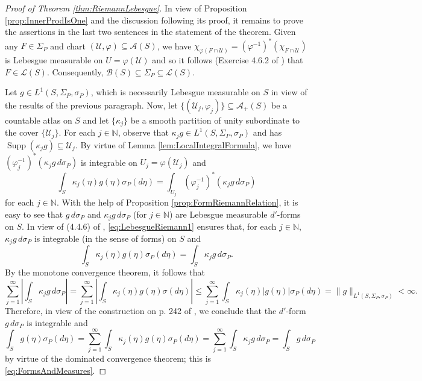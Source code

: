 \documentclass[11pt]{article}
\theoremstyle{remark}
\newcommand\supp{\operatorname{Supp}}
\begin{document}
\begin{proof}[Proof of Theorem \ref{thm:RiemannLebesgue}]
In view of Proposition \ref{prop:InnerProdIsOne} and the discussion following its proof, it remains to prove the assertions in the last two sentences in the statement of the theorem. Given any $F\in \Sigma_P$ and chart $(\mathcal{U},\varphi)\subseteq \mathcal{A}(S)$, we have $\chi_{\varphi(F\cap \mathcal{U})}=(\varphi^{-1})^*\left(\chi_{F\cap\mathcal{U}}\right)$ is Lebesgue measurable on $U=\varphi(\mathcal{U})$ and so it follows (Exercise 4.6.2 of \cite{naber_topology_2011}) that $F\in\mathcal{L}(S)$. Consequently, $\mathcal{B}(S)\subseteq\Sigma_P\subseteq\mathcal{L}(S)$.

Let $g\in L^1(S,\Sigma_P,\sigma_P)$, which is necessarily Lebesgue measurable on $S$ in view of the results of the previous paragraph. Now, let  $\{(\mathcal{U}_j,\varphi_j)\}\subseteq\mathcal{A}_+(S)$ be a countable atlas on $S$ and let $\{\kappa_j\}$ be a smooth partition of unity subordinate to the cover $\{\mathcal{U}_j\}$. For each $j\in\mathbb{N}$, observe that $\kappa_j g\in L^1(S,\Sigma_P,\sigma_P)$ and has $\supp(\kappa_j g)\subseteq \mathcal{U}_j$. By virtue of Lemma \ref{lem:LocalIntegralFormula}, we have $(\varphi_j^{-1})^*(\kappa_j g\,d\sigma_P)$ is integrable on $U_j=\varphi(\mathcal{U}_j)$ and
\begin{equation}\label{eq:LebesgueRiemann1}
\int_S \kappa_j(\eta)g(\eta)\sigma_P(d\eta)=\int_{U_j}(\varphi_j^{-1})^*(\kappa_j g\,d\sigma_P)
\end{equation}
for each $j\in\mathbb{N}$. With the help of Proposition \ref{prop:FormRiemannRelation}, it is easy to see that $g\,d\sigma_P$ and $\kappa_j g\,d\sigma_P$ (for $j\in\mathbb{N}$) are Lebesgue measurable $d'$-forms on $S$. In view of (4.4.6) of \cite{naber_topology_2011}, \eqref{eq:LebesgueRiemann1} ensures that, for each $j\in\mathbb{N}$, $\kappa_j g\,d\sigma_P$ is integrable (in the sense of forms) on $S$ and
\begin{equation*}
\int_S \kappa_j(\eta)g(\eta)\sigma_P(d\eta)=\int_S \kappa_j g\,d\sigma_P.
\end{equation*}
By the monotone convergence theorem, it follows that
\begin{equation*}
\sum_{j=1}^\infty\left| \int_S \kappa_j g\,d\sigma_P\right|=\sum_{j=1}^\infty \left|\int_S \kappa_j(\eta)g(\eta)\sigma(d\eta)\right|\leq \sum_{j=1}^\infty\int_S \kappa_j(\eta)|g(\eta)|\sigma_P(d\eta)=\|g\|_{L^1(S,\Sigma_P,\sigma_P)}<\infty.
\end{equation*}
Therefore, in view of the construction on p. 242 of \cite{naber_topology_2011}, we conclude that the $d'$-form $g\,d\sigma_P$ is integrable and
\begin{equation*}
\int_S g(\eta)\sigma_P(d\eta)=\sum_{j=1}^\infty \int_S \kappa_j(\eta)g(\eta)\sigma_P(d\eta)=\sum_{j=1}^\infty \int_{S} \kappa_j g\,d\sigma_P=\int_S g\,d\sigma_P
\end{equation*}
by virtue of the dominated convergence theorem; this is \eqref{eq:FormsAndMeasures}.


\end{proof}
\end{document}
